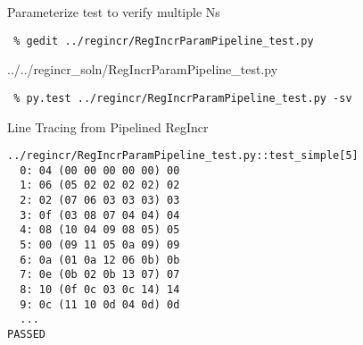 \begin{task}\begin{frame}[fragile]{Parameterize test to verify multiple Ns}

\vspace{-0.15in}
\begin{Verbatim}[commandchars=\\\{\}]
 % cd \midtilde/pymtl-tut/build
 % gedit ../regincr/RegIncrParamPipeline_test.py
\end{Verbatim}

%
{../../regincr_soln/RegIncrParamPipeline_test.py}

\begin{Verbatim}
 % py.test ../regincr/RegIncrParamPipeline_test.py -sv
\end{Verbatim}

\end{frame}
\end{task}

\begin{frame}[fragile]{Line Tracing from Pipelined RegIncr}

\begin{Verbatim}
../regincr/RegIncrParamPipeline_test.py::test_simple[5]
  0: 04 (00 00 00 00 00) 00
  1: 06 (05 02 02 02 02) 02
  2: 02 (07 06 03 03 03) 03
  3: 0f (03 08 07 04 04) 04
  4: 08 (10 04 09 08 05) 05
  5: 00 (09 11 05 0a 09) 09
  6: 0a (01 0a 12 06 0b) 0b
  7: 0e (0b 02 0b 13 07) 07
  8: 10 (0f 0c 03 0c 14) 14
  9: 0c (11 10 0d 04 0d) 0d
  ...
PASSED
\end{Verbatim}

\end{frame}

